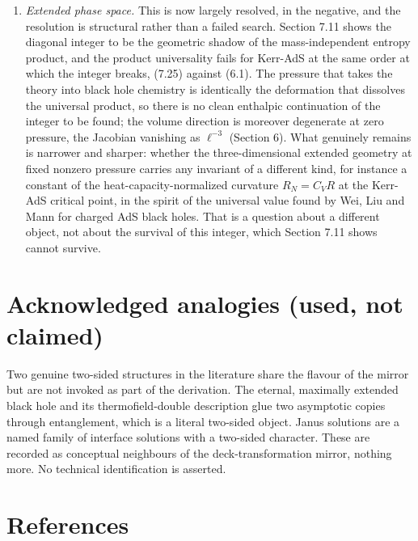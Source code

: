 \documentclass[11pt]{article}
\begin{document}
\begin{enumerate}
\item \emph{Extended phase space.} This is now largely resolved, in the negative, and the resolution is structural rather than a failed search. Section 7.11 shows the diagonal integer to be the geometric shadow of the mass-independent entropy product, and the product universality fails for Kerr-AdS at the same order at which the integer breaks, (7.25) against (6.1). The pressure that takes the theory into black hole chemistry is identically the deformation that dissolves the universal product, so there is no clean enthalpic continuation of the integer to be found; the volume direction is moreover degenerate at zero pressure, the Jacobian vanishing as $\ell^{-3}$ (Section 6). What genuinely remains is narrower and sharper: whether the three-dimensional extended geometry at fixed nonzero pressure carries any invariant of a different kind, for instance a constant of the heat-capacity-normalized curvature $R_N = C_V R$ at the Kerr-AdS critical point, in the spirit of the universal value found by Wei, Liu and Mann for charged AdS black holes. That is a question about a different object, not about the survival of this integer, which Section 7.11 shows cannot survive.
\end{enumerate}



\section{Acknowledged analogies (used, not claimed)}

Two genuine two-sided structures in the literature share the flavour of the mirror but are not invoked as part of the derivation. The eternal, maximally extended black hole and its thermofield-double description glue two asymptotic copies through entanglement, which is a literal two-sided object. Janus solutions are a named family of interface solutions with a two-sided character. These are recorded as conceptual neighbours of the deck-transformation mirror, nothing more. No technical identification is asserted.



\section{References}
\end{document}
